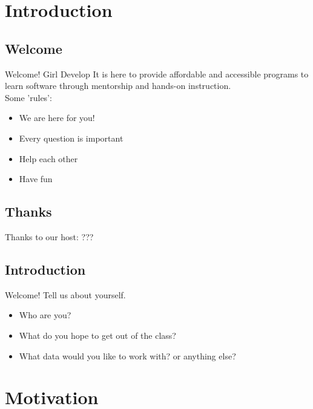 \section{Introduction}
\subsection{Welcome}
\begin{frame}
	\begin{alertblock}{Welcome!}
Girl Develop It is here to provide affordable and accessible programs to learn software through mentorship and hands-on instruction.\\

Some 'rules':
	\begin{itemize}
    	\item We are here for you!
    	\item Every question is important
    	\item Help each other
    	\item Have fun
    \end{itemize}
	\end{alertblock}
\end{frame}

\subsection{Thanks}
\begin{frame}
	Thanks to our host: ???
\end{frame}

\subsection{Introduction}
\begin{frame}
\begin{alertblock}{Welcome!}
Tell us about yourself.
	\begin{itemize}
    	\item Who are you?
    	\item What do you hope to get out of the class?
    	\item What data would you like to work with? or anything else?
    \end{itemize}
\end{alertblock}
\end{frame}

\section{Motivation}
